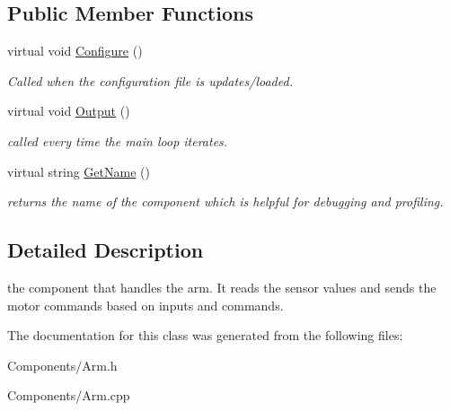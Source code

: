 \subsection*{\-Public \-Member \-Functions}
\begin{DoxyCompactItemize}
\item 
\hypertarget{class_arm_a0b3a6287310f344c35af067509aad924}{
virtual void \hyperlink{class_arm_a0b3a6287310f344c35af067509aad924}{\-Configure} ()}
\label{class_arm_a0b3a6287310f344c35af067509aad924}

\begin{DoxyCompactList}\small\item\em \-Called when the configuration file is updates/loaded. \end{DoxyCompactList}\item 
\hypertarget{class_arm_a7cbf8526410f9de7f3f6bc4303c426f4}{
virtual void \hyperlink{class_arm_a7cbf8526410f9de7f3f6bc4303c426f4}{\-Output} ()}
\label{class_arm_a7cbf8526410f9de7f3f6bc4303c426f4}

\begin{DoxyCompactList}\small\item\em called every time the main loop iterates. \end{DoxyCompactList}\item 
\hypertarget{class_arm_ae3c8d209d62c53edd4d99f85a85dd0f9}{
virtual string \hyperlink{class_arm_ae3c8d209d62c53edd4d99f85a85dd0f9}{\-Get\-Name} ()}
\label{class_arm_ae3c8d209d62c53edd4d99f85a85dd0f9}

\begin{DoxyCompactList}\small\item\em returns the name of the component which is helpful for debugging and profiling. \end{DoxyCompactList}\end{DoxyCompactItemize}


\subsection{\-Detailed \-Description}
the component that handles the arm. \-It reads the sensor values and sends the motor commands based on inputs and commands. 

\-The documentation for this class was generated from the following files\-:\begin{DoxyCompactItemize}
\item 
\-Components/\-Arm.\-h\item 
\-Components/\-Arm.\-cpp\end{DoxyCompactItemize}
